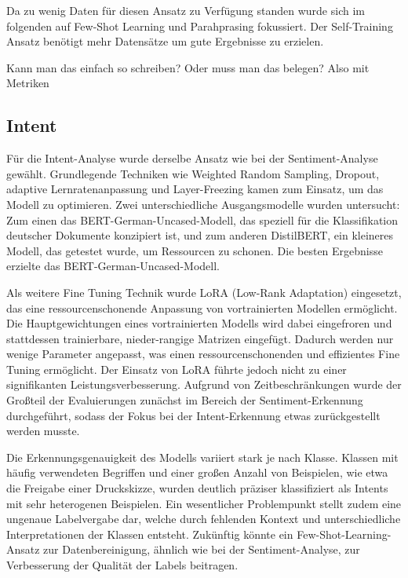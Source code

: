 Da zu wenig Daten für diesen Ansatz zu Verfügung standen wurde sich im folgenden auf Few-Shot
Learning und Parahprasing fokussiert. Der Self-Training Ansatz benötigt mehr Datensätze um
gute Ergebnisse zu erzielen.  

 

Kann man das einfach so schreiben? Oder muss man das belegen? Also mit Metriken



\subsection{Intent} 
Für die Intent-Analyse wurde derselbe Ansatz wie bei der Sentiment-Analyse gewählt. Grundlegende Techniken wie Weighted Random Sampling, Dropout, adaptive Lernratenanpassung und Layer-Freezing kamen zum Einsatz, um das Modell zu optimieren. Zwei unterschiedliche Ausgangsmodelle wurden untersucht: Zum einen das BERT-German-Uncased-Modell, das speziell für die Klassifikation deutscher Dokumente konzipiert ist, und zum anderen DistilBERT, ein kleineres Modell, das getestet wurde, um Ressourcen zu schonen. Die besten Ergebnisse erzielte das BERT-German-Uncased-Modell.

Als weitere Fine Tuning Technik wurde LoRA (Low-Rank Adaptation) eingesetzt, das eine ressourcenschonende Anpassung von vortrainierten Modellen ermöglicht. Die Hauptgewichtungen eines vortrainierten Modells wird dabei eingefroren und stattdessen trainierbare, nieder-rangige Matrizen eingefügt. Dadurch werden nur wenige Parameter angepasst, was einen ressourcenschonenden und effizientes Fine Tuning ermöglicht.
Der Einsatz von LoRA führte jedoch nicht zu einer signifikanten Leistungsverbesserung. Aufgrund von Zeitbeschränkungen wurde der Großteil der Evaluierungen zunächst im Bereich der Sentiment-Erkennung durchgeführt, sodass der Fokus bei der Intent-Erkennung etwas zurückgestellt werden musste.

Die Erkennungsgenauigkeit des Modells variiert stark je nach Klasse. Klassen mit häufig verwendeten Begriffen und einer großen Anzahl von Beispielen, wie etwa die Freigabe einer Druckskizze, wurden deutlich präziser klassifiziert als Intents mit sehr heterogenen Beispielen. Ein wesentlicher Problempunkt stellt zudem eine ungenaue Labelvergabe dar, welche durch fehlenden Kontext und unterschiedliche Interpretationen der Klassen entsteht. Zukünftig könnte ein Few-Shot-Learning-Ansatz zur Datenbereinigung, ähnlich wie bei der Sentiment-Analyse, zur Verbesserung der Qualität der Labels beitragen.


